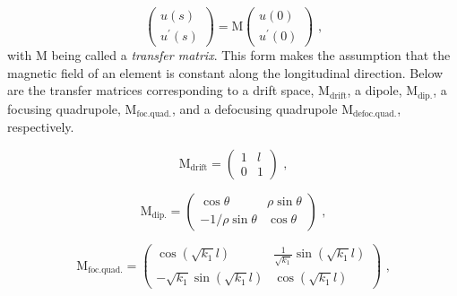 \begin{equation}
    \left(
        \begin{array}{c}
            u(s) \\
            u^{\prime}(s)
        \end{array} \right) = \mathrm{M} \left( 
        \begin{array}{c}
            u(0) \\
            u^{\prime}(0)
    \end{array} \right) \text{ ,}
    \label{equation:hill_solution_matrix}
\end{equation}
with M being called a \emph{transfer matrix}.
This form makes the assumption that the magnetic field of an element is constant along the longitudinal direction. 
Below are the transfer matrices corresponding to a drift space, \(\mathrm{M_{drift}}\), a dipole, \(\mathrm{M_{dip.}}\), a focusing quadrupole, \(\mathrm{M_{foc. quad.}}\), and a defocusing quadrupole \(\mathrm{M_{defoc. quad.}}\), respectively.

\begin{equation}
    \mathrm{M_{drift}} = \left(
        \begin{array}{ll}
            1 & l \\
            0 & 1
    \end{array} \right) \text{ ,}
    \label{equation:drift_transfer_matrix}
\end{equation}

\begin{equation}
    \mathrm{M_{dip.}} = \left(
        \begin{array}{cc}
            \cos \theta           & \rho \sin \theta \\
            -1 / \rho \sin \theta & \cos \theta
    \end{array} \right) \text{ ,}
    \label{equation:dipole_transfer_matrix}
\end{equation}

\begin{equation}
    \mathrm{M_{foc. quad.}} = \left(
        \begin{array}{cc}
            \cos \left( \sqrt{k_1} l \right)             & \frac{1}{\sqrt{k_1}} \sin \left( \sqrt{k_1} l \right) \\
            -\sqrt{k_1} \sin \left( \sqrt{k_1} l \right) & \cos \left( \sqrt{k_1} l \right)
    \end{array} \right) \text{ ,}
    \label{equation:focusing_quad_transfer_matrix}
\end{equation}

